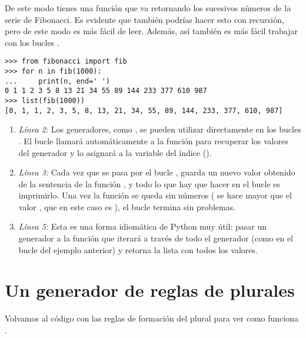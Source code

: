 De este modo tienes una función que va retornando los sucesivos números de la serie de Fibonacci. Es evidente que también podrías hacer esto con recursión, pero de este modo es más fácil de leer. Además, así también es más fácil trabajar con los bucles .

\noindent\begin{minipage}{\textwidth}
\begin{lstlisting}[mathescape=True]
>>> from fibonacci import fib
>>> for n in fib(1000):
...     print(n, end=' ')
0 1 1 2 3 5 8 13 21 34 55 89 144 233 377 610 987
>>> list(fib(1000))
[0, 1, 1, 2, 3, 5, 8, 13, 21, 34, 55, 89, 144, 233, 377, 610, 987]
\end{lstlisting}
\end{minipage}

\begin{enumerate}

\item \emph{Línea 2:} Los generadores, como , se pueden utilizar directamente en los bucles . El bucle  llamará automáticamente a la función  para recuperar los valores del generador  y lo asignará a la variable del índice ().

\item \emph{Línea 3:} Cada vez que se pasa por el bucle ,  guarda un nuevo valor obtenido de la sentencia  de la función , y todo lo que hay que hacer en el bucle es imprimirlo. Una vez la función  se queda sin números ( se hace mayor que el valor , que en este caso es ), el bucle  termina sin problemas.

\item \emph{Línea 5:} Esta es una forma idiomática de Python muy útil: pasar un generador a la función  que iterará a través de todo el generador (como en el bucle  del ejemplo anterior) y retorna la lista con todos los valores.

\end{enumerate}

\section{Un generador de reglas de plurales}

Volvamos al código con las reglas de formación del plural para ver como funciona .

